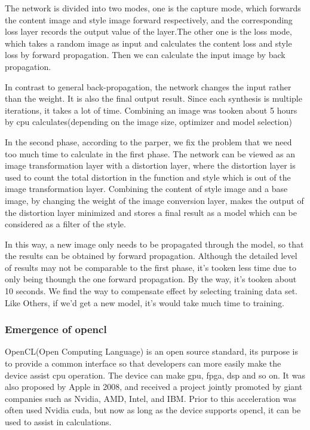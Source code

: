 The network is divided into two modes, one is the capture mode, which forwards the content image and style image forward respectively, and the corresponding loss layer records the output value of the layer.The other one is the loss mode, which takes a random image as input and calculates the content loss and style loss by forward propagation. Then we can calculate the input image by back propagation.

In contrast to general back-propagation, the network changes the input rather than the weight. It is also the final output result. Since each synthesis is multiple iterations, it takes a lot of time. Combining an image was tooken about 5 hours by cpu calculates(depending on the image size, optimizer and model selection)

In the second phase, according to the parper, we fix the problem that we need too much time to calculate in the first phase. The network can be viewed as an image transformation layer with a distortion layer, where the distortion layer is used to count the total distortion in the function and style which is out of the image transformation layer. Combining the content of style image and a base image, by changing the weight of the image conversion layer, makes the output of the distortion layer minimized and stores a final result as a model which can be considered as a filter of the style.

In this way, a new image only needs to be propagated through the model, so that the results can be obtained by forward propagation. Although the detailed level of results may not be comparable to the first phase, it's tooken less time due to only being thoungh the one forward propagation. By the way, it's tooken about 10 seconds. We find the way to compensate effect by selecting training data set. Like Others, if we'd get a new model, it's would take much time to training.

\subsubsection{Emergence of opencl}\label{sec:opencl2}
 OpenCL(Open Computing Language) is an open source standard, its purpose is to provide a common interface so that developers can more easily make the device assist cpu operation. The device can make gpu, fpga, dsp and so on. It was also proposed by Apple in 2008, and received a project jointly promoted by giant companies such as Nvidia, AMD, Intel, and IBM. Prior to this acceleration was often used Nvidia cuda, but now as long as the device supports opencl, it can be used to assist in calculations.

